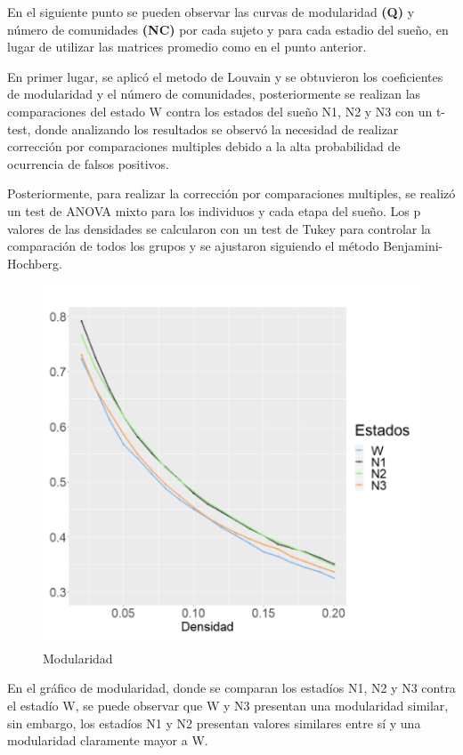 

En el siguiente punto se pueden observar las curvas de modularidad \textbf{(Q)} y número de comunidades \textbf{(NC)} por cada sujeto y para cada estadio del sueño, en lugar de utilizar las matrices promedio como en el punto anterior.

En primer lugar, se aplicó el metodo de Louvain y se obtuvieron los coeficientes de modularidad y el número de comunidades, posteriormente se realizan las comparaciones del estado W contra los estados del sueño N1, N2 y N3 con un t-test, donde analizando los resultados se observó la necesidad de realizar corrección por comparaciones multiples debido a la alta probabilidad de ocurrencia de falsos positivos.

Posteriormente, para realizar la corrección por comparaciones multiples, se realizó un test de ANOVA mixto para los individuos y cada etapa del sueño. Los p valores de las densidades se calcularon con un test de Tukey para controlar la comparación de todos los grupos y se ajustaron siguiendo el método Benjamini-Hochberg.

\begin{figure}[H]
    \centering
    \includegraphics[width = 5in]{img/3_1_Modularidad.jpg}
    \caption{Modularidad}
    \label{fig:3_1_Modularidad}
\end{figure}

En el gráfico de modularidad, donde se comparan los estadíos N1, N2 y N3 contra el estadío W, se puede observar que W y N3 presentan una modularidad similar, sin embargo, los estadíos N1 y N2 presentan valores similares entre sí y una modularidad claramente mayor a W.

